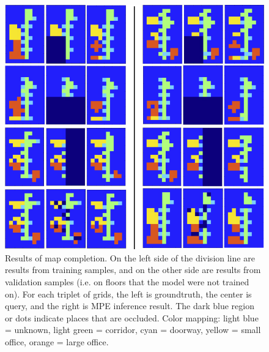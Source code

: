 \documentclass[10pt, titlepage]{article}
\theoremstyle{definition}
\begin{document}
\begin{figure}[!htb]
    \centering
    \captionsetup{width=.8\linewidth}
    \includegraphics[scale=0.75]{images/placegrid_completion.png}
    \caption{Results of map completion. On the left side of the division line are results from training samples, and on the other side are results from validation samples (i.e. on floors that the model were not trained on). For each triplet of grids, the left is groundtruth, the center is query, and the right is MPE inference result. The dark blue region or dots indicate places that are occluded. Color mapping: light blue = unknown, light green = corridor, cyan = doorway, yellow = small office, orange = large office.}
    \label{fig:basic_compl}
\end{figure}
\end{document}
